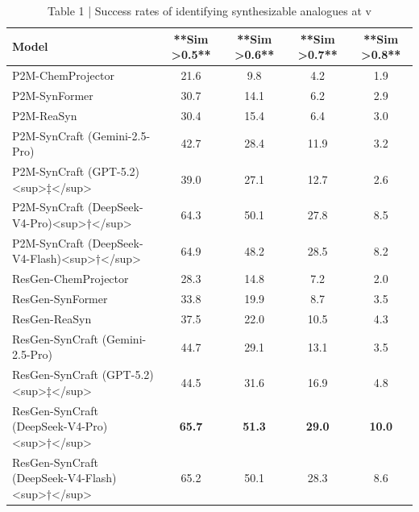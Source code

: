 \begin{table}[t]
\centering
\caption{Table 1 | Success rates of identifying synthesizable analogues at v}
\label{tab:2512.20333}
\begin{tabular}{lcccc}
\toprule
Model & **Sim >0.5** & **Sim >0.6** & **Sim >0.7** & **Sim >0.8** \\
\midrule
P2M-ChemProjector & 21.6 & 9.8 & 4.2 & 1.9 \\
P2M-SynFormer & 30.7 & 14.1 & 6.2 & 2.9 \\
P2M-ReaSyn & 30.4 & 15.4 & 6.4 & 3.0 \\
P2M-SynCraft (Gemini-2.5-Pro) & 42.7 & 28.4 & 11.9 & 3.2 \\
P2M-SynCraft (GPT-5.2)<sup>‡</sup> & 39.0 & 27.1 & 12.7 & 2.6 \\
P2M-SynCraft (DeepSeek-V4-Pro)<sup>†</sup> & 64.3 & 50.1 & 27.8 & 8.5 \\
P2M-SynCraft (DeepSeek-V4-Flash)<sup>†</sup> & 64.9 & 48.2 & 28.5 & 8.2 \\
ResGen-ChemProjector & 28.3 & 14.8 & 7.2 & 2.0 \\
ResGen-SynFormer & 33.8 & 19.9 & 8.7 & 3.5 \\
ResGen-ReaSyn & 37.5 & 22.0 & 10.5 & 4.3 \\
ResGen-SynCraft (Gemini-2.5-Pro) & 44.7 & 29.1 & 13.1 & 3.5 \\
ResGen-SynCraft (GPT-5.2)<sup>‡</sup> & 44.5 & 31.6 & 16.9 & 4.8 \\
ResGen-SynCraft (DeepSeek-V4-Pro)<sup>†</sup> & \textbf{65.7} & \textbf{51.3} & \textbf{29.0} & \textbf{10.0} \\
ResGen-SynCraft (DeepSeek-V4-Flash)<sup>†</sup> & 65.2 & 50.1 & 28.3 & 8.6 \\
\bottomrule
\end{tabular}
\end{table}

